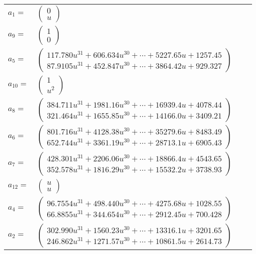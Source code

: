 \documentclass[1p]{elsarticle_modified}
\theoremstyle{definition}
\begin{document}
\begin{tabular}{m{7pt} m{180pt} m{7pt} m{180pt} }
\flushright $a_{1}=$&$\begin{pmatrix}0\\u\end{pmatrix}$ \\
\flushright $a_{9}=$&$\begin{pmatrix}1\\0\end{pmatrix}$ \\
\flushright $a_{5}=$&$\begin{pmatrix}117.780 u^{31}+606.634 u^{30}+\cdots+5227.65 u+1257.45\\87.9105 u^{31}+452.847 u^{30}+\cdots+3864.42 u+929.327\end{pmatrix}$ \\
\flushright $a_{10}=$&$\begin{pmatrix}1\\u^2\end{pmatrix}$ \\
\flushright $a_{8}=$&$\begin{pmatrix}384.711 u^{31}+1981.16 u^{30}+\cdots+16939.4 u+4078.44\\321.464 u^{31}+1655.85 u^{30}+\cdots+14166.0 u+3409.21\end{pmatrix}$ \\
\flushright $a_{6}=$&$\begin{pmatrix}801.716 u^{31}+4128.38 u^{30}+\cdots+35279.6 u+8483.49\\652.744 u^{31}+3361.19 u^{30}+\cdots+28713.1 u+6905.43\end{pmatrix}$ \\
\flushright $a_{7}=$&$\begin{pmatrix}428.301 u^{31}+2206.06 u^{30}+\cdots+18866.4 u+4543.65\\352.578 u^{31}+1816.29 u^{30}+\cdots+15532.2 u+3738.93\end{pmatrix}$ \\
\flushright $a_{12}=$&$\begin{pmatrix}u\\u\end{pmatrix}$ \\
\flushright $a_{4}=$&$\begin{pmatrix}96.7554 u^{31}+498.440 u^{30}+\cdots+4275.68 u+1028.55\\66.8855 u^{31}+344.654 u^{30}+\cdots+2912.45 u+700.428\end{pmatrix}$ \\
\flushright $a_{2}=$&$\begin{pmatrix}302.990 u^{31}+1560.23 u^{30}+\cdots+13316.1 u+3201.65\\246.862 u^{31}+1271.57 u^{30}+\cdots+10861.5 u+2614.73\end{pmatrix}$ \\

\end{tabular}
\end{document}
